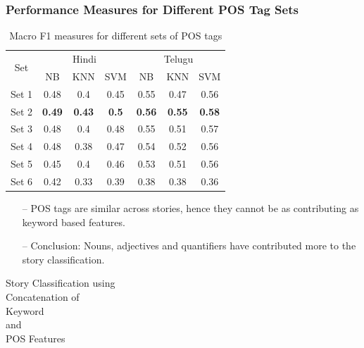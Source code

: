 \documentclass{beamer}
\begin{document}
\begin{frame}
\frametitle{Performance Measures for Different POS Tag Sets}
\begin{table}[h]
\renewcommand{\arraystretch}{1}
\caption {Macro F1 measures for different sets of POS tags \label{Table: POS}}
\footnotesize\setlength{\tabcolsep}{6pt}
\centering
\begin{tabular}{|c|c|c|c|c|c|c|}
\hline
\multirow{2}{*}{Set} & \multicolumn{3}{c|}{Hindi} & \multicolumn{3}{c|}{Telugu} \\ \cline{2-7} 
 & NB & KNN & SVM & NB & KNN & SVM \\ \hline
Set 1 & 0.48 & 0.4 & 0.45 & 0.55 & 0.47 & 0.56 \\ \hline
Set 2 & \textbf{0.49} & \textbf{0.43} & \textbf{0.5} & \textbf{0.56} & \textbf{0.55} & \textbf{0.58} \\ \hline
Set 3 & 0.48 & 0.4 & 0.48 & 0.55 & 0.51 & 0.57 \\ \hline
Set 4 & 0.48 & 0.38 & 0.47 & 0.54 & 0.52 & 0.56 \\ \hline
Set 5 & 0.45 & 0.4 & 0.46 & 0.53 & 0.51 & 0.56 \\ \hline
Set 6 & 0.42 & 0.33 & 0.39 & 0.38 & 0.38 & 0.36 \\ \hline
\end{tabular}
\end{table}

\begin{itemize}
\item[--] POS tags are similar across stories, hence they cannot be as contributing as keyword based features.
\item[--] Conclusion: Nouns, adjectives and quantifiers have contributed more to the story classification.
\end{itemize}
\end{frame}


\begin{frame}
\begin{center}
\Huge{Story Classification using\\ Concatenation of\\ Keyword\\ and\\ POS Features}
\end{center}
\end{frame}
\end{document}
